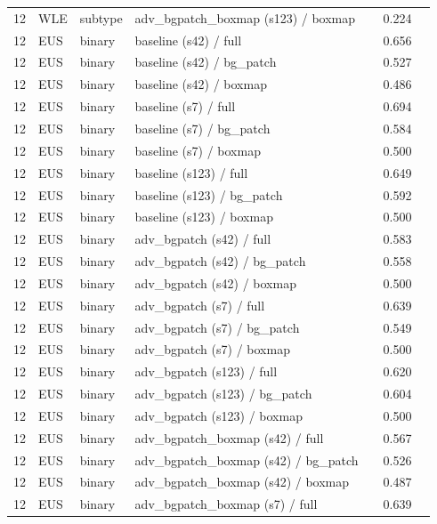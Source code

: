 \begin{longtable}{cL{1.1cm}L{1.5cm}L{5.6cm}ccc}
12 & WLE & subtype & adv\_bgpatch\_boxmap (s123) / boxmap & \nl{} & 0.224 & \nl{} \\
12 & EUS & binary & baseline (s42) / full & \nl{} & 0.656 & \nl{} \\
12 & EUS & binary & baseline (s42) / bg\_patch & \nl{} & 0.527 & \nl{} \\
12 & EUS & binary & baseline (s42) / boxmap & \nl{} & 0.486 & \nl{} \\
12 & EUS & binary & baseline (s7) / full & \nl{} & 0.694 & \nl{} \\
12 & EUS & binary & baseline (s7) / bg\_patch & \nl{} & 0.584 & \nl{} \\
12 & EUS & binary & baseline (s7) / boxmap & \nl{} & 0.500 & \nl{} \\
12 & EUS & binary & baseline (s123) / full & \nl{} & 0.649 & \nl{} \\
12 & EUS & binary & baseline (s123) / bg\_patch & \nl{} & 0.592 & \nl{} \\
12 & EUS & binary & baseline (s123) / boxmap & \nl{} & 0.500 & \nl{} \\
12 & EUS & binary & adv\_bgpatch (s42) / full & \nl{} & 0.583 & \nl{} \\
12 & EUS & binary & adv\_bgpatch (s42) / bg\_patch & \nl{} & 0.558 & \nl{} \\
12 & EUS & binary & adv\_bgpatch (s42) / boxmap & \nl{} & 0.500 & \nl{} \\
12 & EUS & binary & adv\_bgpatch (s7) / full & \nl{} & 0.639 & \nl{} \\
12 & EUS & binary & adv\_bgpatch (s7) / bg\_patch & \nl{} & 0.549 & \nl{} \\
12 & EUS & binary & adv\_bgpatch (s7) / boxmap & \nl{} & 0.500 & \nl{} \\
12 & EUS & binary & adv\_bgpatch (s123) / full & \nl{} & 0.620 & \nl{} \\
12 & EUS & binary & adv\_bgpatch (s123) / bg\_patch & \nl{} & 0.604 & \nl{} \\
12 & EUS & binary & adv\_bgpatch (s123) / boxmap & \nl{} & 0.500 & \nl{} \\
12 & EUS & binary & adv\_bgpatch\_boxmap (s42) / full & \nl{} & 0.567 & \nl{} \\
12 & EUS & binary & adv\_bgpatch\_boxmap (s42) / bg\_patch & \nl{} & 0.526 & \nl{} \\
12 & EUS & binary & adv\_bgpatch\_boxmap (s42) / boxmap & \nl{} & 0.487 & \nl{} \\
12 & EUS & binary & adv\_bgpatch\_boxmap (s7) / full & \nl{} & 0.639 & \nl{} \\

\end{longtable}
